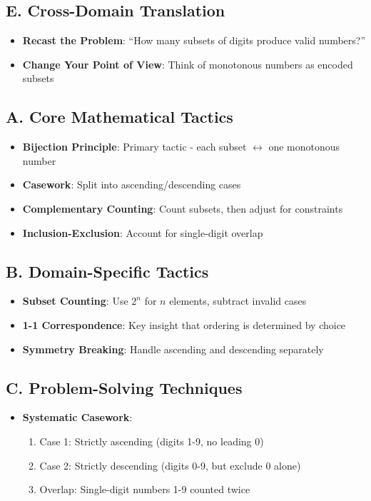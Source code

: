 \documentclass[]{article}
\begin{document}
\begin{strategicbox}
\subsection*{E. Cross-Domain Translation}
\begin{itemize}[leftmargin=*]
    \item \textbf{Recast the Problem}: ``How many subsets of digits produce valid numbers?''
    \item \textbf{Change Your Point of View}: Think of monotonous numbers as encoded subsets
\end{itemize}
\end{strategicbox}

\begin{tacticalbox}
\subsection*{A. Core Mathematical Tactics}
\begin{itemize}[leftmargin=*]
    \item \textbf{Bijection Principle}: Primary tactic - each subset $\leftrightarrow$ one monotonous number
    \item \textbf{Casework}: Split into ascending/descending cases
    \item \textbf{Complementary Counting}: Count subsets, then adjust for constraints
    \item \textbf{Inclusion-Exclusion}: Account for single-digit overlap
\end{itemize}

\subsection*{B. Domain-Specific Tactics}
\begin{itemize}[leftmargin=*]
    \item \textbf{Subset Counting}: Use $2^n$ for $n$ elements, subtract invalid cases
    \item \textbf{1-1 Correspondence}: Key insight that ordering is determined by choice
    \item \textbf{Symmetry Breaking}: Handle ascending and descending separately
\end{itemize}

\subsection*{C. Problem-Solving Techniques}
\begin{itemize}[leftmargin=*]
    \item \textbf{Systematic Casework}:
    \begin{enumerate}
        \item Case 1: Strictly ascending (digits 1-9, no leading 0)
        \item Case 2: Strictly descending (digits 0-9, but exclude 0 alone)
        \item Overlap: Single-digit numbers 1-9 counted twice
    \end{enumerate}
    

\end{itemize}
\end{tacticalbox}
\end{document}
